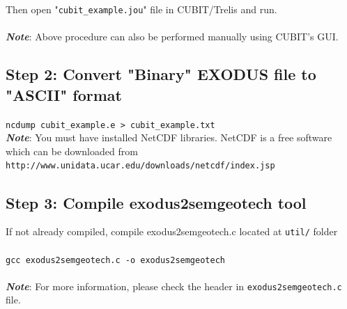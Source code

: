 \colorbox{gray}{
\parbox{16cm}{
}}
\\
\\
Then open "\texttt{cubit\_example.jou}" file in CUBIT/Trelis and run.\\
\\
\textbf{\emph{Note}}: Above procedure can also be performed manually using CUBIT's GUI.

\subsection*{Step 2: Convert "Binary" EXODUS file to "ASCII" format}
\texttt{ncdump cubit\_example.e > cubit\_example.txt}\\

\textbf{\emph{Note}}: You must have installed NetCDF libraries. NetCDF is a free software which can be downloaded from
\texttt{http://www.unidata.ucar.edu/downloads/netcdf/index.jsp}

\subsection*{Step 3: Compile exodus2semgeotech tool}
If not already compiled, compile exodus2semgeotech.c located at \texttt{util/} folder\\
\\
\texttt{gcc exodus2semgeotech.c -o exodus2semgeotech}
\\
\\
\textbf{\emph{Note}}: For more information, please check the header in \texttt{exodus2semgeotech.c} file.

